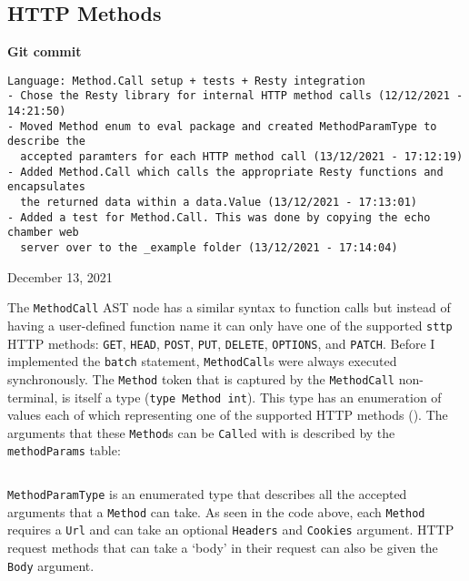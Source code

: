 \subsection{HTTP Methods}

\begin{center}
    \textbf{Git commit}
    \begin{verbatim}
Language: Method.Call setup + tests + Resty integration
- Chose the Resty library for internal HTTP method calls (12/12/2021 - 14:21:50)
- Moved Method enum to eval package and created MethodParamType to describe the
  accepted paramters for each HTTP method call (13/12/2021 - 17:12:19)
- Added Method.Call which calls the appropriate Resty functions and encapsulates
  the returned data within a data.Value (13/12/2021 - 17:13:01)
- Added a test for Method.Call. This was done by copying the echo chamber web
  server over to the _example folder (13/12/2021 - 17:14:04)
    \end{verbatim}
    \vspace{-1em}
    \tiny{December 13, 2021}
\end{center}

The \verb|MethodCall| AST node has a similar syntax to function calls but instead of having a user-defined function name it can only have one of the supported \verb|sttp| HTTP methods\textsuperscript{\cite{http_request_methods}}: \verb|GET|, \verb|HEAD|, \verb|POST|, \verb|PUT|, \verb|DELETE|, \verb|OPTIONS|, and \verb|PATCH|. Before I implemented the \verb|batch| statement, \verb|MethodCall|s were always executed synchronously. The \verb|Method| token that is captured by the \verb|MethodCall| non-terminal, is itself a type (\texttt{type Method int}). This type has an enumeration of values each of which representing one of the supported HTTP methods (). The arguments that these \verb|Method|s can be \verb|Call|ed with is described by the \verb|methodParams| table:

\inputminted[firstline=76, lastline=86, autogobble, breaklines, tabsize=4]{go}{../../src/eval/methods.go}

\verb|MethodParamType| is an enumerated type that describes all the accepted arguments that a \verb|Method| can take. As seen in the code above, each \verb|Method| requires a \verb|Url| and can take an optional \verb|Headers| and \verb|Cookies| argument. HTTP request methods that can take a `body' in their request can also be given the \verb|Body| argument.

